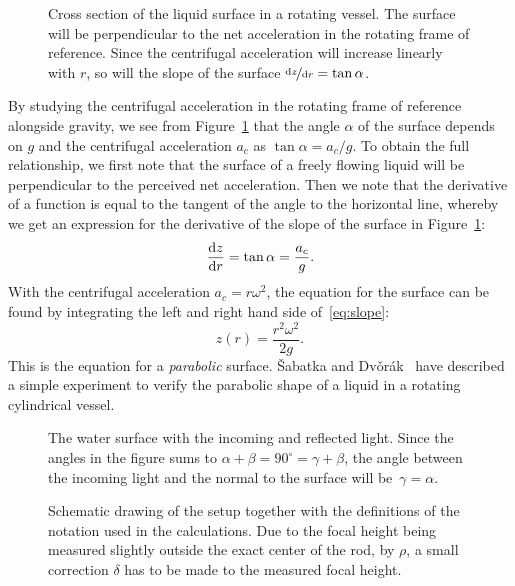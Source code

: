 \documentclass[12pt, a4paper, twocolumn]{article}
\begin{document}
\begin{figure}\centering
\resizebox{7.5cm}{!}{}
\caption{Cross section of the liquid surface in a rotating vessel. The surface will be perpendicular to the net acceleration in the rotating frame of reference. Since the centrifugal acceleration will increase linearly with $r$, so will the slope of the surface ${\nicefrac{\dd{z}}{\dd{r}}=\tan\alpha}$. }
\label{fig:parabola} 
\end{figure}

By studying the centrifugal acceleration in the rotating frame of reference alongside gravity, we see from Figure~\ref{fig:parabola} that the angle $\alpha$ of the surface depends on $g$ and the centrifugal acceleration $a_c$ as $\tan\alpha=a_c/g$. To obtain the full relationship, we first note that the surface of a freely flowing liquid will be perpendicular to the perceived net acceleration. Then we note that the derivative of a function is equal to the tangent of the angle to the horizontal line, whereby we get an expression for the derivative of the slope of the surface in Figure~\ref{fig:parabola}:
\begin{equation}\label{eq:slope}
\dv{z}{r} = \tan\alpha = \frac{a_c}{g}.
\end{equation}
With the centrifugal acceleration $a_c=r\omega^2$, the equation for the surface can be found by integrating the left and right hand side of~\eqref{eq:slope}: 
\begin{equation}\label{eq:parabola}
z(r)=\frac{r^2\omega^2}{2g}.
\end{equation}
This is the equation for a \emph{parabolic} surface. \v{S}abatka and Dv\v{o}rák~\cite{Sabatka2010} have described a simple experiment to verify the parabolic shape of a liquid in a rotating cylindrical vessel. 

\begin{figure}\centering
\resizebox{4cm}{!}{}
\caption{
The water surface with the incoming and reflected light. Since the angles in the figure sums to $\alpha+\beta= 90^\circ = \gamma+\beta$, the angle between the incoming light and the normal to the surface will be~$\gamma=\alpha$. }
\label{fig:angles} 
\end{figure}

\begin{figure}
\centering
\resizebox{9cm}{!}{}
\caption{
Schematic drawing of the setup together with the definitions of the notation used in the calculations. Due to the focal height being measured slightly outside the exact center of the rod, by $\rho$, a small correction $\delta$ has to be made to the measured focal height.} 
\label{fig:rot_bowl} 
\end{figure}
\end{document}

